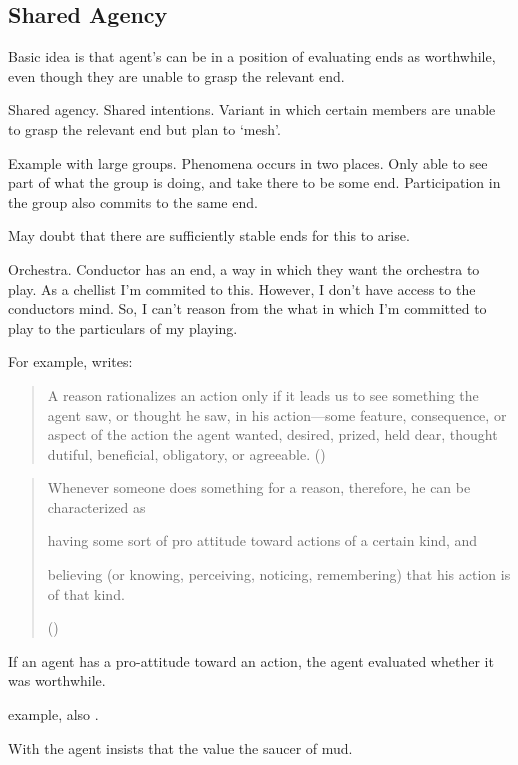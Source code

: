 \documentclass[10pt]{article}
\begin{document}
\subsection{Shared Agency}
\label{sec:shared-agency}

Basic idea is that agent's can be in a position of evaluating ends as worthwhile, even though they are unable to grasp the relevant end.

Shared agency.
Shared intentions.
Variant in which certain members are unable to grasp the relevant end but plan to `mesh'.

Example with large groups.
Phenomena occurs in two places.
Only able to see part of what the group is doing, and take there to be some end.
Participation in the group also commits to the same end.

May doubt that there are sufficiently stable ends for this to arise.

Orchestra.
Conductor has an end, a way in which they want the orchestra to play.
As a chellist I'm commited to this.
However, I don't have access to the conductors mind.
So, I can't reason from the what in which I'm committed to play to the particulars of my playing.

\newpage


For example, \citeauthor{Davidson:1963aa} writes:

\begin{quote}
  A reason rationalizes an action only if it leads us to see something the agent saw, or thought he saw, in his action---some feature, consequence, or aspect of the action the agent wanted, desired, prized, held dear, thought dutiful, beneficial, obligatory, or agreeable.\nolinebreak
  \mbox{}\hfill\mbox{(\citeyear[686]{Davidson:1963aa})}
\end{quote}

\begin{quote}
  Whenever someone does something for a reason, therefore, he can be characterized as
  \begin{enumerate*}[label=(\alph*), ref=(\alph*)]
  \item\label{davidson:a} having some sort of pro attitude toward actions of a certain kind, and
  \item\label{davidson:b} believing (or knowing, perceiving, noticing, remembering) that his action is of that kind.
  \end{enumerate*}
  \mbox{}\hfill\mbox{(\citeyear[686--686]{Davidson:1963aa})}
\end{quote}

If an agent has a pro-attitude toward an action, the agent evaluated whether it was worthwhile.


\citeauthor{Anscombe:1957aa} example, also \citeauthor{Quinn:1993aa}.

With \citeauthor{Anscombe:1957aa} the agent insists that the value the saucer of mud.
\end{document}

